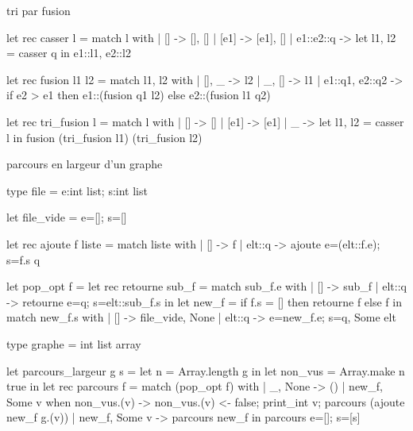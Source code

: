 

\begin{adjustwidth}{-3cm}{-3cm}


\begin{implementation}{1}{tri par fusion}
    \begin{lstOCaml}
    let rec casser l =
        match l with
        | [] -> [], []
        | [e1] -> [e1], []
        | e1::e2::q -> 
            let l1, l2 = casser q in
            e1::l1, e2::l2

    let rec fusion l1 l2 = 
        match l1, l2 with
        | [], _ -> l2
        | _, [] -> l1
        | e1::q1, e2::q2 ->
            if e2 > e1 then
                e1::(fusion q1 l2)
            else
                e2::(fusion l1 q2)

    let rec tri_fusion l =
        match l with
        | [] -> []
        | [e1] -> [e1]
        | _ -> 
            let l1, l2 = casser l in
            fusion (tri_fusion l1) (tri_fusion l2)
    \end{lstOCaml}
\end{implementation}

\begin{implementation}{2}{parcours en largeur d'un graphe}
    \begin{lstOCaml}
        type file = {e:int list; s:int list}
            
        let file_vide = {e=[]; s=[]}             
        
        let rec ajoute f liste = match liste with
            | [] -> f
            | elt::q -> ajoute {e=(elt::f.e); s=f.s} q 
                
        let pop_opt f = 
            let rec retourne sub_f =
                match sub_f.e with
                | [] -> sub_f
                | elt::q -> retourne {e=q; s=elt::sub_f.s}   
            in let new_f = 
                if f.s = [] then
                    retourne f 
                else f 
            in match new_f.s with 
            | [] -> file_vide, None
            | elt::q -> {e=new_f.e; s=q}, Some elt
                        
          
                           
        type graphe = int list array 
            
        let parcours_largeur g s =
            let n = Array.length g in
            let non_vus = Array.make n true in
            let rec parcours f =
                match (pop_opt f) with
                | _, None -> ()
                | new_f, Some v when non_vus.(v) ->
                    non_vus.(v) <- false;
                    print_int v;
                    parcours (ajoute new_f g.(v))
                | new_f, Some v ->
                    parcours new_f
            in parcours {e=[]; s=[s]} 
    \end{lstOCaml}
\end{implementation}


\end{adjustwidth}
